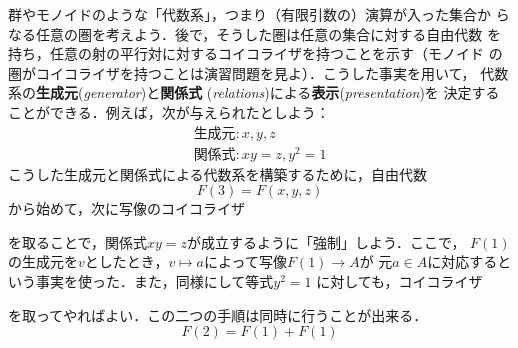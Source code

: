 \begin{example}[代数の表示]\label{FinPresAlg}
 群やモノイドのような「代数系」，つまり（有限引数の）演算が入った集合か
 らなる任意の圏を考えよう．後で，そうした圏は任意の集合に対する自由代数
 を持ち，任意の射の平行対に対するコイコライザを持つことを示す（モノイド
 の圏がコイコライザを持つことは演習問題を見よ）．こうした事実を用いて，
 代数系の{\bfseries 生成元}({\itshape generator})と{\bfseries 関係式}
 ({\itshape relations})による{\bfseries 表示}({\itshape presentation})を
 決定することができる．例えば，次が与えられたとしよう：
 \begin{equation}
   \begin{array}{l}
  \text{生成元}: x, y, z\\
  \text{関係式}: xy = z, y^2 = 1\label{生成元と関係式}
   \end{array}
 \end{equation}
 こうした生成元と関係式による代数系を構築するために，自由代数
 \[
  F(3) = F(x, y, z)
 \]
 から始めて，次に写像のコイコライザ
 \begin{center}
 \end{center}
 を取ることで，関係式$xy = z$が成立するように「強制」しよう．ここで，
 $F(1)$の生成元を$v$としたとき，$v \mapsto a$によって写像$F(1) \to A$が
 元$a \in A$に対応するという事実を使った．また，同様にして等式$y^2 = 1$
 に対しても，コイコライザ
 \begin{center}
 \end{center}
 を取ってやればよい．この二つの手順は同時に行うことが出来る．
 \[
  F(2) = F(1) + F(1)
 \]
  \begin{center}
\end{center}
\end{example}
